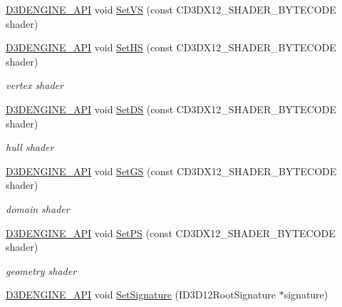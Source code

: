 \begin{DoxyCompactItemize}
\item 
\mbox{\hyperlink{stdafx_8h_a8ee2d990c5dfba7794dd2b60741d7722}{D3\+D\+E\+N\+G\+I\+N\+E\+\_\+\+A\+PI}} void \mbox{\hyperlink{class_p_s_o_manager_a15d9aa9d5491c74d6d79300a560907c9}{Set\+VS}} (const C\+D3\+D\+X12\+\_\+\+S\+H\+A\+D\+E\+R\+\_\+\+B\+Y\+T\+E\+C\+O\+DE shader)
\item 
\mbox{\hyperlink{stdafx_8h_a8ee2d990c5dfba7794dd2b60741d7722}{D3\+D\+E\+N\+G\+I\+N\+E\+\_\+\+A\+PI}} void \mbox{\hyperlink{class_p_s_o_manager_ae47d5393d8b85d30e300505703664922}{Set\+HS}} (const C\+D3\+D\+X12\+\_\+\+S\+H\+A\+D\+E\+R\+\_\+\+B\+Y\+T\+E\+C\+O\+DE shader)
\begin{DoxyCompactList}\small\item\em vertex shader \end{DoxyCompactList}\item 
\mbox{\hyperlink{stdafx_8h_a8ee2d990c5dfba7794dd2b60741d7722}{D3\+D\+E\+N\+G\+I\+N\+E\+\_\+\+A\+PI}} void \mbox{\hyperlink{class_p_s_o_manager_adafbbb5fa3b2fda0a51141c8d4afdd07}{Set\+DS}} (const C\+D3\+D\+X12\+\_\+\+S\+H\+A\+D\+E\+R\+\_\+\+B\+Y\+T\+E\+C\+O\+DE shader)
\begin{DoxyCompactList}\small\item\em hull shader \end{DoxyCompactList}\item 
\mbox{\hyperlink{stdafx_8h_a8ee2d990c5dfba7794dd2b60741d7722}{D3\+D\+E\+N\+G\+I\+N\+E\+\_\+\+A\+PI}} void \mbox{\hyperlink{class_p_s_o_manager_afe604c8d31fd10721f04b6deab4b0bf0}{Set\+GS}} (const C\+D3\+D\+X12\+\_\+\+S\+H\+A\+D\+E\+R\+\_\+\+B\+Y\+T\+E\+C\+O\+DE shader)
\begin{DoxyCompactList}\small\item\em domain shader \end{DoxyCompactList}\item 
\mbox{\hyperlink{stdafx_8h_a8ee2d990c5dfba7794dd2b60741d7722}{D3\+D\+E\+N\+G\+I\+N\+E\+\_\+\+A\+PI}} void \mbox{\hyperlink{class_p_s_o_manager_a959ea6b1f4a67e00c77ed6281154f80a}{Set\+PS}} (const C\+D3\+D\+X12\+\_\+\+S\+H\+A\+D\+E\+R\+\_\+\+B\+Y\+T\+E\+C\+O\+DE shader)
\begin{DoxyCompactList}\small\item\em geometry shader \end{DoxyCompactList}\item 
\mbox{\hyperlink{stdafx_8h_a8ee2d990c5dfba7794dd2b60741d7722}{D3\+D\+E\+N\+G\+I\+N\+E\+\_\+\+A\+PI}} void \mbox{\hyperlink{class_p_s_o_manager_ad1d6778bb35a972ab295b0dd5912ea8c}{Set\+Signature}} (I\+D3\+D12\+Root\+Signature $\ast$signature)

\end{DoxyCompactItemize}
